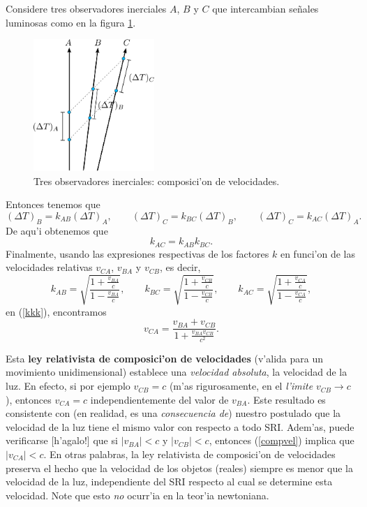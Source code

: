 Considere tres observadores inerciales $A$, $B$ y $C$ que intercambian se\~nales
luminosas como en la figura \ref{k3}.
\begin{figure}[!h]
\centerline{\includegraphics[height= 5cm]{fig/fig-diagrama-composicion-velocidades.pdf}}
 \caption{Tres observadores inerciales: composici'on de velocidades.}
\label{k3}
\end{figure}
 Entonces tenemos que
\begin{equation}
(\Delta T)_B=k_{AB} (\Delta T)_A, \qquad (\Delta T)_C=k_{BC} (\Delta T)_B,
\qquad (\Delta T)_C=k_{AC} (\Delta T)_A.
\end{equation}
De aqu'i obtenemos que
\begin{equation}
k_{AC}=k_{AB}k_{BC}.\label{kkk}
\end{equation}
Finalmente, usando las expresiones respectivas de los factores $k$ en funci'on
de las velocidades relativas $v_{CA}$, $v_{BA}$ y $v_{CB}$, es decir,
\begin{equation}
k_{AB}=\sqrt{\frac{1+\frac{v_{BA}}{c}}{1-\frac{v_{BA}}{c}}}, \qquad k_{BC}=\sqrt{\frac{1+\frac{v_{CB}}{c}}{1-\frac{v_{CB}}{c}}} , \qquad k_{AC}=\sqrt{\frac{1+\frac{v_{CA}}{c}}{1-\frac{v_{CA}}{c}}},
\end{equation}
en (\ref{kkk}), encontramos
\begin{equation}
\boxed{v_{CA}=\frac{v_{BA}+v_{CB}}{1+\frac{v_{BA}v_{CB}}{c^2}}.} \label{compvel}
\end{equation}

Esta \textbf{ley relativista de composici'on de velocidades} (v'alida para un movimiento unidimensional) establece una \textit{velocidad absoluta}, la
velocidad de la luz. En efecto, si por ejemplo $v_{CB}=c$ (m'as rigurosamente, en el \textit{l'imite} $v_{CB}\to c$), entonces $v_{CA}=c$ independientemente del valor de $v_{BA}$. Este resultado es consistente con (en realidad, es una \textit{consecuencia de}) nuestro postulado que la velocidad de la luz tiene el mismo valor con respecto a todo SRI. Adem'as, puede verificarse [h'agalo!] que si $|v_{BA}|<c$ y $|v_{CB}|<c$, entonces  (\ref{compvel}) implica que $|v_{CA}|<c$. En otras palabras, la ley relativista de composici'on de velocidades preserva el hecho que la velocidad de los objetos (reales) siempre es menor que la velocidad de la luz, independiente del SRI respecto al cual se determine esta velocidad. Note que esto \textit{no} ocurr'ia en la teor'ia newtoniana.

